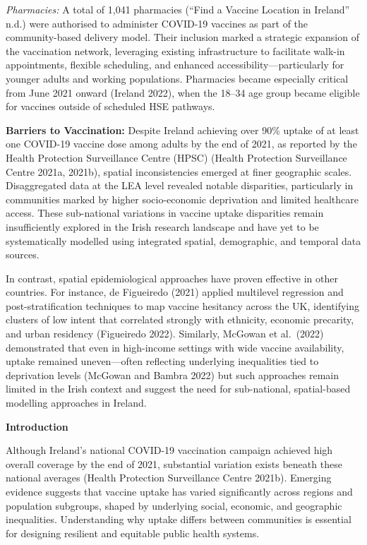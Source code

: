 \documentclass{article}
\begin{document}
\emph{Pharmacies:} A total of 1,041 pharmacies ({``Find a Vaccine
Location in {Ireland}''} n.d.) were authorised to administer COVID-19
vaccines as part of the community-based delivery model. Their inclusion
marked a strategic expansion of the vaccination network, leveraging
existing infrastructure to facilitate walk-in appointments, flexible
scheduling, and enhanced accessibility---particularly for younger adults
and working populations. Pharmacies became especially critical from June
2021 onward (Ireland 2022), when the 18--34 age group became eligible
for vaccines outside of scheduled HSE pathways.

\textbf{Barriers to Vaccination:} Despite Ireland achieving over 90\%
uptake of at least one COVID-19 vaccine dose among adults by the end of
2021, as reported by the Health Protection Surveillance Centre (HPSC)
(Health Protection Surveillance Centre 2021a, 2021b), spatial
inconsistencies emerged at finer geographic scales. Disaggregated data
at the LEA level revealed notable disparities, particularly in
communities marked by higher socio-economic deprivation and limited
healthcare access. These sub-national variations in vaccine uptake
disparities remain insufficiently explored in the Irish research
landscape and have yet to be systematically modelled using integrated
spatial, demographic, and temporal data sources.

In contrast, spatial epidemiological approaches have proven effective in
other countries. For instance, de Figueiredo (2021) applied multilevel
regression and post-stratification techniques to map vaccine hesitancy
across the UK, identifying clusters of low intent that correlated
strongly with ethnicity, economic precarity, and urban residency
(Figueiredo 2022). Similarly, McGowan et al.~(2022) demonstrated that
even in high-income settings with wide vaccine availability, uptake
remained uneven---often reflecting underlying inequalities tied to
deprivation levels (McGowan and Bambra 2022) but such approaches remain
limited in the Irish context and suggest the need for sub-national,
spatial-based modelling approaches in Ireland.

\textbf{Introduction}

Although Ireland's national COVID-19 vaccination campaign achieved high
overall coverage by the end of 2021, substantial variation exists
beneath these national averages (Health Protection Surveillance Centre
2021b). Emerging evidence suggests that vaccine uptake has varied
significantly across regions and population subgroups, shaped by
underlying social, economic, and geographic inequalities. Understanding
why uptake differs between communities is essential for designing
resilient and equitable public health systems.
\end{document}
